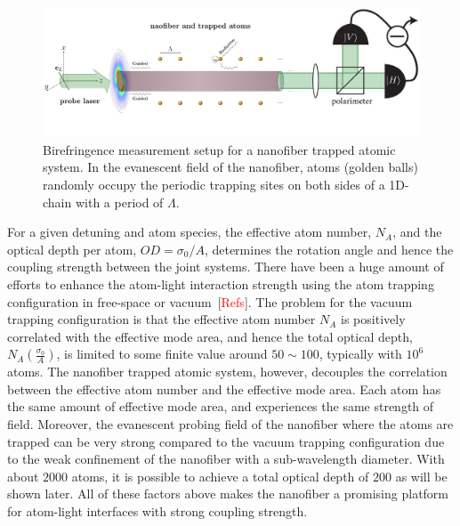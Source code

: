 \documentclass[preprint,aps,pra,onecolumn]{revtex4-1} %
\begin{document}
\begin{figure}
\centering
\includegraphics[scale=0.35]{./Figs/BirefringenceMeasurement_randomAtoms}
\caption{Birefringence measurement setup for a nanofiber trapped atomic system. In the evanescent 
field of the nanofiber, atoms (golden balls) randomly  occupy the periodic trapping sites on both sides of 
a 1D-chain with a period of $\Lambda$.}
\label{fig:BirefringenceMeasurement}
\end{figure}


For a given detuning and atom species, the effective atom number, $N_A$, and the optical depth per atom, $ OD=\sigma_0/A$, determines the rotation angle and hence the coupling strength between the joint systems. There have been a huge amount of efforts to enhance the atom-light interaction strength using the atom trapping configuration in free-space or vacuum~[\textcolor{red}{Refs}]. The problem for the vacuum trapping configuration is that the effective atom number $N_A$ is positively correlated with the effective mode area, and hence the total optical depth, $N_A\left( \frac{\sigma_0}{A}\right)$, is limited to some finite value around $50\sim 100$, typically with $10^6$ atoms. The nanofiber trapped atomic system, however, decouples the correlation between the effective atom number and the effective mode area. Each atom has the same amount of effective mode area, and experiences the same strength of field. Moreover, the evanescent probing field of the nanofiber where the atoms are trapped can be very strong compared to the vacuum trapping configuration due to the weak confinement of the nanofiber with a sub-wavelength diameter. With about $2000$ atoms, it is possible to achieve a total optical depth of $200$ as will be shown later. All of these factors above makes the nanofiber a promising platform for atom-light interfaces with strong coupling strength. 
\end{document}
